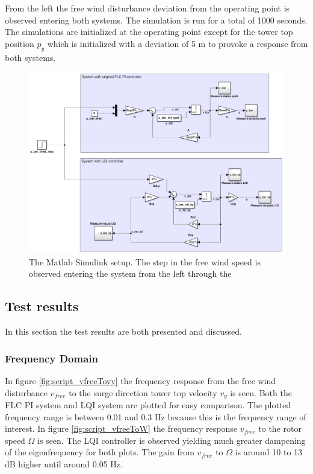 From the left the free wind disturbance deviation from the operating point is observed entering both systems. The simulation is run for a total of 1000 seconds.
The simulations are initialized at the operating point except for the tower top position $ p_y $ which is initialized with a deviation of 5 m to provoke a response from both systems.
\begin{figure}[ht]
	\centering
	\includegraphics[width=0.95\linewidth]{Graphics/TestResults/linearModPerf/simulink_setup.png}
	\caption{The Matlab Simulink setup. The step in the free wind speed is observed entering the system from the left through the }
	\label{fig:simulink_setup2}
\end{figure}


\subsection{Test results}
In this section the test results are both presented and discussed.


\subsubsection{Frequency Domain}
In figure \cref{fig:script_vfreeTovy} the frequency response from the free wind disturbance $ v_{free} $ to the surge direction tower top velocity $ v_y $ is seen. Both the FLC PI system and LQI system are plotted for easy comparison. The plotted frequency range is between 0.01 and 0.3 Hz because this is the frequency range of interest. In figure \cref{fig:script_vfreeToW} the frequency response $ v_{free} $ to the rotor speed $ \Omega $ is seen. The LQI controller is observed yielding much greater dampening of the eigenfrequency for both plots. The gain from $ v_{free} $ to $ \Omega $ is around 10 to 13 dB higher until around 0.05 Hz. 

